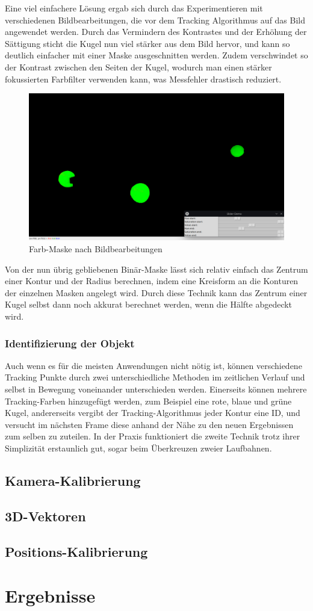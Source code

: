 \documentclass[12pt]{article}
\begin{document}
Eine viel einfachere Lösung ergab sich durch das Experimentieren mit verschiedenen Bildbearbeitungen, die vor dem Tracking Algorithmus auf das Bild angewendet werden.  
Durch das Vermindern des Kontrastes und der Erhöhung der Sättigung sticht die Kugel nun viel stärker aus dem Bild hervor, und kann so deutlich einfacher mit einer Maske ausgeschnitten werden. Zudem verschwindet so der Kontrast zwischen den Seiten der Kugel, wodurch man einen stärker fokussierten Farbfilter verwenden kann, was Messfehler drastisch reduziert.  
\newpage
\begin{figure}
  {\setlength{\belowcaptionskip}{-30pt}
    \includegraphics[angle=0,width=\linewidth]{2d-color-filter.jpg}
    \caption{Farb-Maske nach Bildbearbeitungen}
  }
\end{figure}
Von der nun übrig gebliebenen Binär-Maske lässt sich relativ einfach das Zentrum einer Kontur und der Radius berechnen, indem eine Kreisform an die Konturen der einzelnen Masken angelegt wird. Durch diese Technik kann das Zentrum einer Kugel selbst dann noch akkurat berechnet werden, wenn die Hälfte abgedeckt wird. 

\subsubsection{Identifizierung der Objekt}
Auch wenn es für die meisten Anwendungen nicht nötig ist, können verschiedene Tracking Punkte durch zwei unterschiedliche Methoden im zeitlichen Verlauf und selbst in Bewegung voneinander unterschieden werden. Einerseits können mehrere Tracking-Farben hinzugefügt werden, zum Beispiel eine rote, blaue und grüne Kugel, andererseits vergibt der Tracking-Algorithmus jeder Kontur eine ID, und versucht im nächsten Frame diese anhand der Nähe zu den neuen Ergebnissen zum selben zu zuteilen. In der Praxis funktioniert die zweite Technik trotz ihrer Simplizität erstaunlich gut, sogar beim Überkreuzen zweier Laufbahnen.  

\subsection{Kamera-Kalibrierung}
\subsection{3D-Vektoren}
\subsection{Positions-Kalibrierung}


\section{Ergebnisse}
\end{document}
